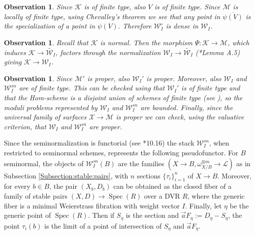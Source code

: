 \documentclass[11pt]{amsart}
\newcommand{\cE}{\mathcal{W}}
\newcommand{\cM}{\mathcal{M}}
\newcommand{\sL}{\mathscr{L}}
\newcommand{\spec}{\operatorname{Spec}}
\newcommand{\Kg}{\mathcal{K}}
\newtheorem{Oss}[theorem]{Observation}
\theoremstyle{definition}
\begin{document}
\begin{Oss}\label{Oss:specialization:of:the:interior:of:the:moduli}
Since $\Kg$ is \emph{of finite type}, also $V$ is of finite type. Since $\mathcal{M}$ is locally of finite type,
using Chevalley's theorem we see that any point in $\overline{\psi(V)}$ is the specialization of a point in $\psi(V)$. Therefore
$\cE_I^\circ$ is dense in $\cE_I$.
\end{Oss}
 \begin{Oss}\label{Oss:definition:psi:KtoW}Recall that $\Kg$ is normal. Then the morphism $\Psi:\Kg \to \cM$, which induces $\Kg \to \widetilde{\cE_I}$, factors through the normalization $\cE_I \to \widetilde{\cE_I}$ (\cite{AB3}*{Lemma A.5}) giving $\Kg \to \cE_I$.
 \end{Oss}
\begin{Oss}Since $\mathcal{M}'$ is proper, also $\cE_I'$ is proper. Moreover, also $\cE_I$ and $\cE_I^{sn}$ are of finite type. This can be checked using that $\cE_I'$ is of finite type and that the Hom-scheme is a disjoint union of schemes of finite type (see \cite{arbarello-cornalba-griffiths}), so the moduli problems represented by $\cE_I$ and $\cE_I^{sn}$ are bounded. Finally, since the universal family of surfaces $\mathcal{X} \to \mathcal{M}$ is proper we can check, using the valuative criterion, that $\cE_I$ and $\cE_I^{sn}$ are proper.
\end{Oss}
Since the seminormalization is functorial (see \cite{Kollarsing}*{10.16}) the stack $\cE_I^{sn}$, when restricted to seminormal schemes, represents the following pseudofunctor. For $B$ seminormal, the objects of $\cE_I^{sn}(B)$ are the families $(X\to B,\omega_{X/B}^{\otimes m} \to \sL)$ as in Subsection \ref{Subsection:stable:pairs}, with $n$ sections $\{\tau_i\}_{i=1}^n$ of $X \to B$. Moreover, for every $b \in B$, the pair $(X_b,D_b)$ can be obtained as the closed fiber of a family of stable pairs $(X,D) \to \spec(R)$ over a DVR $R$, where the generic fiber is a minimal Weierstrass fibration with weight vector $I$. Finally, let $\eta$ be the generic point of $\spec(R)$. Then if $S_\eta$ is the section and $\vec{a}F_\eta:=D_\eta-S_\eta$, the point $\tau_i(b)$ is the limit of a point of intersection of $S_\eta$ and $\vec{a}F_\eta$.  
\end{document}
